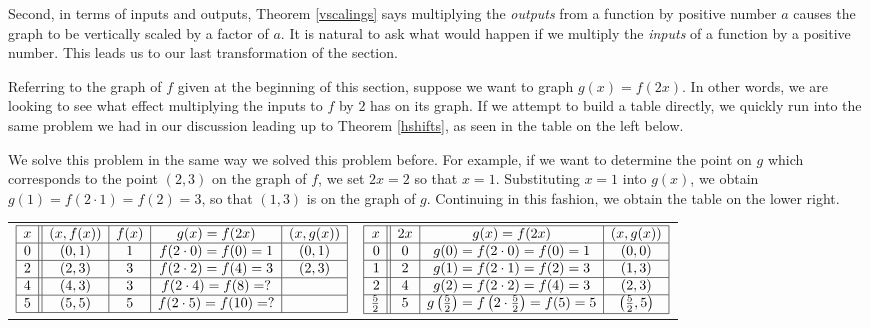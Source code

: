 \documentclass{ximera}
\begin{document}
\smallskip

Second, in terms of inputs and outputs, Theorem \ref{vscalings} says multiplying the \textit{outputs} from a function by positive number $a$ causes the graph to be vertically scaled by a factor of $a$.  It is natural to ask what would happen if we multiply the \textit{inputs} of a function by a positive number.  This leads us to our last transformation of the section.

\smallskip

Referring to the graph of $f$ given at the beginning of this section, suppose we want to graph $g(x) = f(2x)$.  In other words, we are looking to see what effect multiplying the inputs to $f$ by $2$ has on its graph.  If we attempt to build a table directly, we quickly run into the same problem we had in our discussion leading up to Theorem \ref{hshifts}, as seen in the table on the left below.  

\smallskip

We solve this problem in the same way we solved this problem before.  For example, if we want to determine the point on $g$ which corresponds to the point $(2,3)$ on the graph of $f$,  we set $2x =2 $ so that $x=1$.  Substituting $x=1$ into $g(x)$, we obtain $g(1) = f(2 \cdot 1) = f(2) = 3$, so that $(1,3)$ is on the graph of $g$. Continuing in this fashion, we obtain the table on the lower right.   

\smallskip

\begin{tabular}{cc}

$ \begin{array}{|c||c|c|c|c|}  

\hline

x & (x,f(x)) & f(x)& g(x)=f(2x) & (x, g(x)) \\ \hline
0  & (0,1)& 1 & f(2 \cdot 0) = f(0) = 1   &(0, 1) \\  \hline
2 & (2,3) & 3 & f(2\cdot2) = f(4) = 3  &(2,3) \\  \hline
4 & (4,3) & 3 &  f(2 \cdot 4) = f(8) = ? &  \\  \hline
5 & (5,5) & 5 & f(2 \cdot 5) = f(10) = ?  &  \\  \hline

\end{array} $ 

&

$ \begin{array}{|r||c|c|c|}  

\hline

x & 2x & g(x)=f(2x) & (x, g(x)) \\ \hline
0 & 0 & g(0)= f(2 \cdot 0) = f(0) = 1   &(0, 0) \\  \hline
1 &  2 &  g(1)=f(2 \cdot 1) = f(2)  = 3  &(1,3) \\  \hline
2 & 4  & g(2)=f(2 \cdot 2) = f(4) = 3 &  (2,3)\\  \hline
\frac{5}{2}  & 5 & g\left(\frac{5}{2}\right)=f\left(2 \cdot \frac{5}{2} \right) = f(5) = 5  & \left(\frac{5}{2},5\right) \\ [1pt] \hline

\end{array} $

\end{tabular} 
\end{document}
